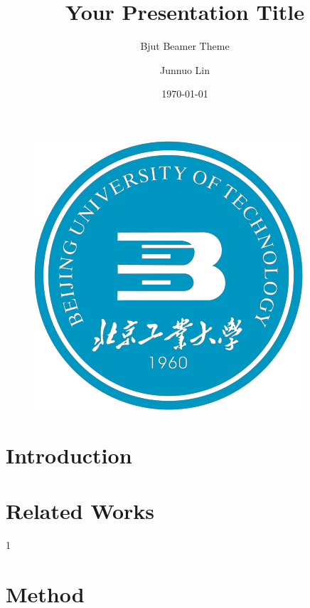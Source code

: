 \documentclass{beamer}
\author{Junnuo Lin}
\title{Your Presentation Title}
\subtitle{Bjut Beamer Theme}
\institute{
    Beijing University of Technology
}
\date{\today}
\begin{document}
\begin{frame}
    \titlepage
    \begin{figure}[htpb]
        \begin{center}
            \includegraphics[keepaspectratio, scale=0.25]{pic/Bjut_logo.png}
        \end{center}
    \end{figure}
\end{frame}

\begin{frame}
    \tableofcontents[sectionstyle=show,subsectionstyle=show/shaded/hide,subsubsectionstyle=show/shaded/hide]
\end{frame}

\section{Introduction}
\begin{frame}
\end{frame}

\section{Related Works}

\begin{frame}
	1
\end{frame}



\section{Method}
\end{document}
